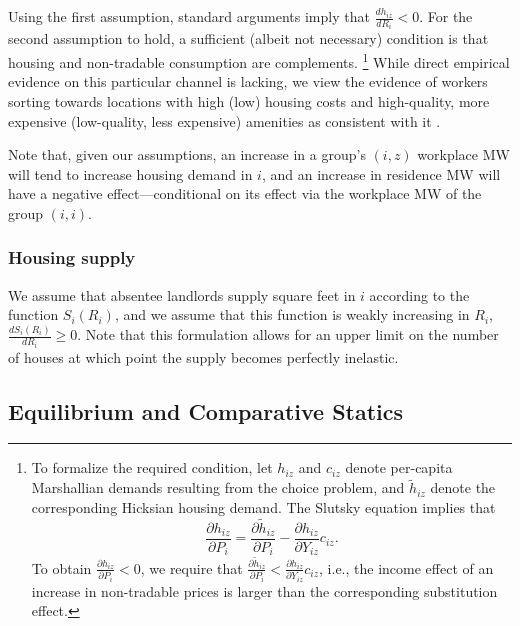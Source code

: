 Using the first assumption, standard arguments imply that 
$\frac{d h_{iz}}{d R_i} < 0$.
For the second assumption to hold, 
a sufficient (albeit not necessary) condition is that housing and non-tradable
consumption are complements.%
\footnote{To formalize the required condition, let $h_{iz}$ and $c_{iz}$ denote 
per-capita Marshallian demands resulting from the choice problem, and 
$\tilde h_{iz}$ denote the corresponding Hicksian housing demand.
The Slutsky equation implies that
$$\frac{\partial h_{iz}}{\partial P_i}
   = \frac{\partial \tilde h_{iz}}{\partial P_i}
   - \frac{\partial h_{iz}}{\partial Y_{iz}} c_{iz}.$$
To obtain $\frac{\partial h_{iz}}{\partial P_i} < 0$, we require that
$\frac{\partial \tilde h_{iz}}{\partial P_i}
< \frac{\partial h_{iz}}{\partial Y_{iz}} c_{iz}$, i.e., the income effect of an
increase in non-tradable prices is larger than the corresponding substitution
effect.}
While direct empirical evidence on this particular channel is lacking,
we view the evidence of workers sorting towards locations with high (low) housing 
costs and high-quality, more expensive (low-quality, less expensive) amenities 
as consistent with it \parencite[e.g.,][]{CoutureEtAl2019}.

Note that, given our assumptions,
an increase in a group's $(i,z)$ workplace MW will tend to increase housing 
demand in $i$,
and an increase in residence MW will have a negative effect---conditional on 
its effect via the workplace MW of the group $(i,i)$.

\subsubsection*{Housing supply}

We assume that absentee landlords supply square feet in $i$ according to the 
function $S_i(R_i)$,
and we assume that this function is weakly increasing in $R_i$, 
$\frac{d S_i(R_i)}{d R_i} \ge 0$.
Note that this formulation allows for an upper limit on the number of houses at 
which point the supply becomes perfectly inelastic.

\subsection{Equilibrium and Comparative Statics}

